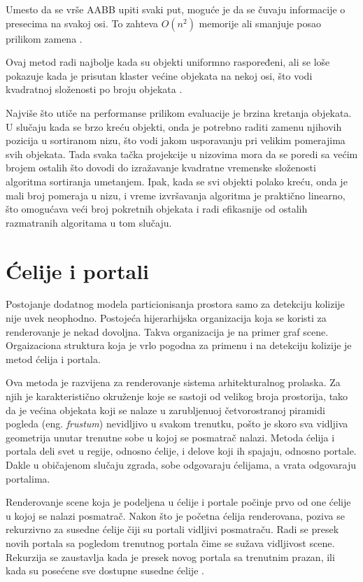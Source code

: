 \documentclass[12pt,oneside]{memoir}
\begin{document}
Umesto da se vrše AABB upiti svaki put, moguće je da se čuvaju informacije o presecima 
na svakoj osi. To zahteva $O(n^2)$ memorije ali smanjuje posao prilikom zamena \cite{sap}. 

Ovaj metod radi najbolje kada su objekti uniformno raspoređeni, ali se loše pokazuje kada je
prisutan klaster većine objekata na nekoj osi, što vodi kvadratnoj složenosti po broju objekata \cite{glavna2}.

Najviše što utiče na performanse prilikom evaluacije je brzina kretanja objekata. 
U slučaju kada se brzo kreću objekti, onda je potrebno raditi zamenu njihovih pozicija u sortiranom nizu,
što vodi jakom usporavanju pri velikim pomerajima svih objekata. Tada svaka tačka projekcije u nizovima mora 
da se poredi sa većim brojem ostalih što dovodi do izražavanje kvadratne vremenske složenosti algoritma sortiranja umetanjem.
Ipak, kada se svi objekti polako kreću, onda je mali broj pomeraja u nizu, i vreme izvršavanja algoritma je praktično 
linearno, što omogućava veći broj pokretnih objekata i radi efikasnije od ostalih razmatranih algoritama u tom slučaju.

\section{Ćelije i portali}
\label{subsec:cells}

Postojanje dodatnog modela particionisanja prostora samo za detekciju kolizije nije uvek neophodno.
Postojeća hijerarhijska organizacija koja se koristi za renderovanje je nekad dovoljna.
Takva organizacija je na primer graf scene. Orgaizaciona struktura koja je vrlo pogodna
za primenu i na detekciju kolizije je metod ćelija i portala.

Ova metoda je razvijena za renderovanje sistema arhitekturalnog prolaska. 
Za njih je karakteristično okruženje koje se sastoji od velikog broja prostorija, tako da je 
većina objekata koji se nalaze u zarubljenuoj četvorostranoj piramidi pogleda (eng. {\em frustum})
nevidljivo u svakom trenutku, pošto je skoro sva vidljiva geometrija unutar trenutne sobe
u kojoj se posmatrač nalazi.
Metoda ćelija i portala deli svet u regije, odnosno ćelije, i delove koji ih spajaju, odnosno portale.
Dakle u običajenom slučaju zgrada, sobe odgovaraju ćelijama, a vrata odgovaraju portalima. 

Renderovanje scene koja je podeljena u ćelije i portale počinje prvo od one ćelije u 
kojoj se nalazi posmatrač. Nakon što je početna ćelija renderovana, poziva se rekurzivno
za susedne ćelije čiji su portali vidljivi posmatraču. Radi se presek novih portala
sa pogledom trenutnog portala čime se sužava vidljivost scene. Rekurzija se zaustavlja 
kada je presek novog portala sa trenutnim prazan, ili kada su posećene sve dostupne susedne ćelije \cite{glavnaKnjiga}.
\end{document}
